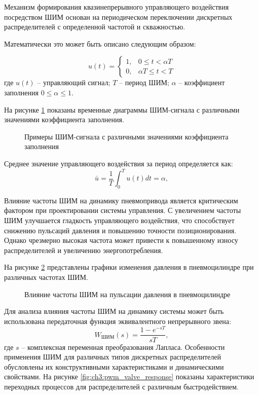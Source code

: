 Механизм формирования квазинепрерывного управляющего воздействия
посредством ШИМ основан на периодическом переключении дискретных
распределителей с определенной частотой и скважностью.

Математически это может быть описано следующим образом:

\begin{equation*}
    u(t) = \begin{cases}
        1, & 0 \leq t < \alpha T \\
        0, & \alpha T \leq t < T
    \end{cases}
\end{equation*}
где $u(t)$ -- управляющий сигнал;
$T$ -- период ШИМ;
$\alpha$ -- коэффициент заполнения $0 \leq \alpha \leq 1$.

На рисунке \ref{fig:ch3:pwm_example} показаны временные диаграммы ШИМ-сигнала
с различными значениями коэффициента заполнения.

\begin{figure}[ht]
    \caption{Примеры ШИМ-сигнала с различными значениями коэффициента заполнения}
    \label{fig:ch3:pwm_example}
\end{figure}

Среднее значение управляющего воздействия за период определяется как:
\begin{equation*}
    \bar{u} = \frac{1}{T} \int_0^T u(t) dt = \alpha,
\end{equation*}

Влияние частоты ШИМ на динамику пневмопривода является критическим фактором при
проектировании системы управления. С увеличением частоты ШИМ улучшается
гладкость управляющего воздействия, что способствует снижению пульсаций давления
и повышению точности позиционирования. Однако чрезмерно высокая частота может привести
к повышенному износу распределителей и увеличению энергопотребления.

На рисунке \ref{fig:ch3:pwm_pressure_response} представлены графики изменения
давления в пневмоцилиндре при различных частотах ШИМ.

\begin{figure}[ht]
    \centerfloat{
    }
    \caption{Влияние частоты ШИМ на пульсации давления в пневмоцилиндре}
    \label{fig:ch3:pwm_pressure_response}
\end{figure}

Для анализа влияния частоты ШИМ на динамику системы может быть использована передаточная функция эквивалентного непрерывного звена:
\begin{equation*}
    W_{\text{ШИМ}}(s) = \frac{1 - e^{-sT}}{sT},
\end{equation*}
где $s$ -- комплексная переменная преобразования Лапласа.
Особенности применения ШИМ для различных типов дискретных
распределителей обусловлены их конструктивными характеристиками и
динамическими свойствами. На рисунке \ref{fig:ch3:pwm_valve_response} показаны
характеристики переходных процессов для распределителей с различным быстродействием.


